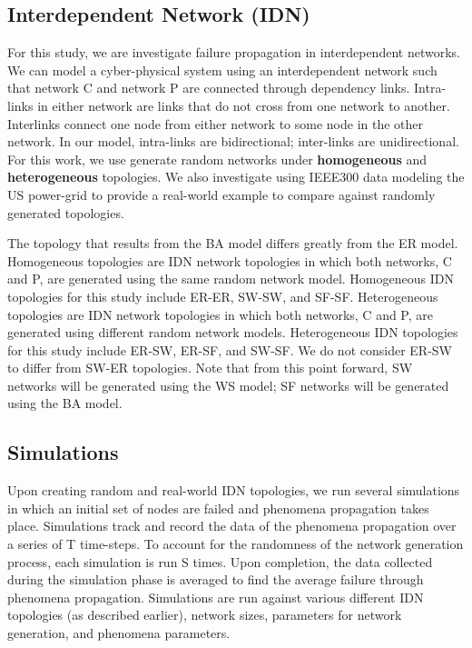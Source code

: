 \documentclass[letterpaper, 10 pt, conference]{ieeeconf}  %
\begin{document}
\subsection{Interdependent Network (IDN)}
For this study, we are investigate failure propagation in interdependent networks. We can model a cyber-physical system using an interdependent network such that network C and network P are connected through dependency links. Intra-links in either network are links that do not cross from one network to another. Interlinks connect one node from either network to some node in the other network. In our model, intra-links are bidirectional; inter-links are unidirectional. For this work, we use generate random networks under \textbf{homogeneous} and \textbf{heterogeneous} topologies. We also investigate using IEEE300 data modeling the US power-grid to provide a real-world example to compare against randomly generated topologies.

The topology that results from the BA model differs greatly from the ER model. Homogeneous topologies are IDN network topologies in which both networks, C and P, are generated using the same random network model. Homogeneous IDN topologies for this study include ER-ER, SW-SW, and SF-SF.  Heterogeneous topologies are IDN network topologies in which both networks, C and P, are generated using different random network models. Heterogeneous IDN topologies for this study include ER-SW, ER-SF, and SW-SF. We do not consider ER-SW to differ from SW-ER topologies. Note that from this point forward, SW networks will be generated using the WS model; SF networks will be generated using the BA model.





\subsection{Simulations}
Upon creating random and real-world IDN topologies, we run several simulations in which an initial set of nodes are failed and phenomena propagation takes place. Simulations track and record the data of the phenomena propagation over a series of T time-steps. To account for the randomness of the network generation process, each simulation is run S times. Upon completion, the data collected during the simulation phase is averaged to find the average failure through phenomena propagation. Simulations are run against various different IDN topologies (as described earlier), network sizes, parameters for network generation, and phenomena parameters.
\end{document}

